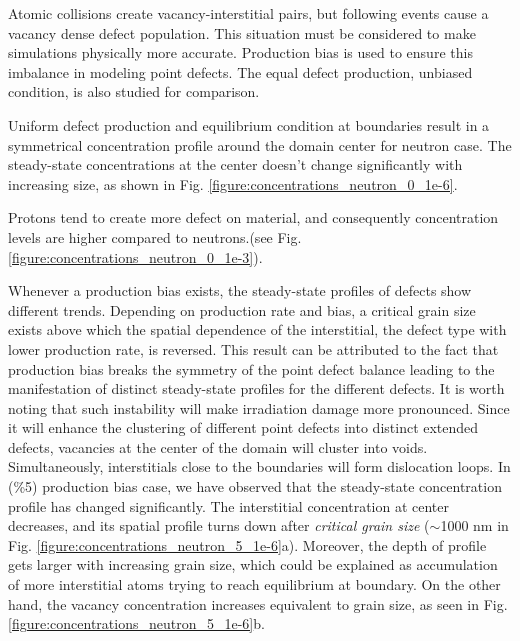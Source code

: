 \documentclass[utf8]{frontiersSCNS} %
\begin{document}
    Atomic collisions create vacancy-interstitial pairs, but following events cause a vacancy dense defect population. This situation must be considered to make simulations physically more accurate. Production bias is used to ensure this imbalance in modeling point defects. The equal defect production, unbiased condition, is also studied for comparison.

    Uniform defect production and equilibrium condition at boundaries result in a symmetrical concentration profile around the domain center for neutron case. The steady-state concentrations at the center doesn't change significantly with increasing size, as shown in Fig. \ref{figure:concentrations_neutron_0_1e-6}.

    Protons tend to create more defect on material, and consequently concentration levels are higher compared to neutrons.(see Fig. \ref{figure:concentrations_neutron_0_1e-3}).


    Whenever a production bias exists, the steady-state profiles of defects show different trends. Depending on production rate and bias, a critical grain size exists above which the spatial dependence of the interstitial, the defect type with lower production rate, is reversed. This result can be attributed to the fact that production bias breaks the symmetry of the point defect balance leading to the manifestation of distinct steady-state profiles for the different defects. It is worth noting that such instability will make irradiation damage more pronounced.
    Since it will enhance the clustering of different point defects into distinct extended defects, vacancies at the center of the domain will cluster into voids. Simultaneously, interstitials close to the boundaries will form dislocation loops.
    In (\%5) production bias case, we have observed that the steady-state concentration profile has changed significantly. The interstitial concentration at center decreases, and its spatial profile turns down after \textit{critical grain size} (${\sim}$1000 nm in Fig. \ref{figure:concentrations_neutron_5_1e-6}a). Moreover, the depth of profile gets larger with increasing grain size, which could be explained as accumulation of more interstitial atoms trying to reach equilibrium at boundary. On the other hand, the vacancy concentration increases equivalent to grain size, as seen in Fig. \ref{figure:concentrations_neutron_5_1e-6}b.
\end{document}
